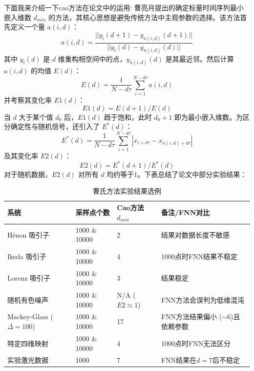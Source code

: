 下面我来介绍一下cao方法在论文中的运用:
曹亮月\cite{cao1997practical}提出的确定标量时间序列最小嵌入维数 $d_{min}$ 的方法，其核心思想是避免传统方法中主观参数的选择。该方法首先定义一个量 $a(i,d)$：
\begin{equation}
    a(i,d) = \frac{||y_i(d+1) - y_{n(i,d)}(d+1)||}{||y_i(d) - y_{n(i,d)}(d)||}
\end{equation}
其中 $y_i(d)$ 是 $d$ 维重构相空间中的点，$y_{n(i,d)}(d)$ 是其最近邻。然后计算 $a(i,d)$ 的均值 $E(d)$：
\begin{equation}
    E(d) = \frac{1}{N-d\tau}\sum_{i=1}^{N-d\tau} a(i,d)
\end{equation}
并考察其变化率 $E1(d)$：
\begin{equation}
    E1(d) = E(d+1)/E(d)
\end{equation}
当 $d$ 大于某个值 $d_0$ 后，$E1(d)$ 趋于饱和，此时 $d_0+1$ 即为最小嵌入维数。为区分确定性与随机信号，还引入了 $E^*(d)$：
\begin{equation}
    E^*(d) = \frac{1}{N-d\tau}\sum_{i=1}^{N-d\tau} |x_{i+d\tau} - x_{n(i,d)+d\tau}|
\end{equation}
及其变化率 $E2(d)$：
\begin{equation}
    E2(d) = E^*(d+1)/E^*(d)
\end{equation}
对于随机数据，$E2(d)$ 对所有 $d$ 均约等于1。下表总结了论文中部分实验结果：

\begin{table}[h!]
    \centering
    \caption{曹氏方法实验结果选例}
    \label{tab:cao_results_adjusted} %
    \begin{tabular}{|l|l|l|>{\raggedright\arraybackslash}p{3.5cm}|} %
        \hline
        \textbf{系统}                 & \textbf{采样点个数} & \textbf{Cao方法 $d_{min}$} & \textbf{备注/FNN对比}        \\
        \hline
        Hénon 吸引子                   & 1000 \& 10000  & 2                        & 结果对数据长度不敏感               \\
        \hline
        Ikeda 吸引子                   & 1000 \& 10000  & 4                        & 1000点时FNN结果不稳定           \\
        \hline
        Lorenz 吸引子                  & 1000 \& 10000  & 3                        & 结果稳定                     \\
        \hline
        随机有色噪声                      & 1000 \& 10000  & N/A ($E2 \approx 1$)     & FNN方法会误判为低维混沌            \\
        \hline
        Mackey-Glass ($\Delta=100$) & 1000 \& 10000  & 17                       & FNN方法结果偏小 ($\sim$6)且依赖参数 \\
        \hline
        特定四维映射                      & 1000 \& 10000  & 4                        & 1000点时FNN无法区分            \\
        \hline
        实验激光数据                      & 1000           & 7                        & FNN结果在$d=7$后不稳定          \\
        \hline
    \end{tabular}
\end{table}

